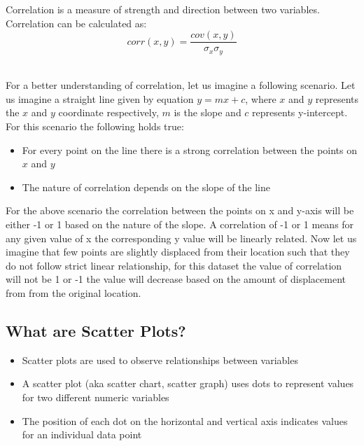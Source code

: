 \documentclass[twoside,12pt]{report}  %
\begin{document}
\begin{tcolorbox}[colback=red!5!white, colframe=red!75!black, title = \textbf{Covariance}]
	Correlation is a measure of strength and direction between two variables. Correlation can be calculated as:
	$$ \boxed{corr(x,y) = \frac{cov(x,y)}{\sigma_{x}\sigma_{y}}} $$
\end{tcolorbox}
\noindent
\\
For a better understanding of correlation, let us imagine a following scenario. Let us imagine a straight line given by equation $y=mx+c$, where $x$ and $y$ represents the $x$ and $y$ coordinate respectively, $m$ is the slope and $c$ represents y-intercept. For this scenario the following holds true:
\begin{itemize}
	\item For every point on the line there is a strong correlation between the points on $x$ and $y$
	\item The nature of correlation depends on the slope of the line
\end{itemize} 
\noindent
For the above scenario the correlation between the points on x and y-axis will be either -1 or 1 based on the nature of the slope. A correlation of -1 or 1 means for any given value of x the corresponding y value will be linearly related. Now let us imagine that few points are slightly displaced from their location such that they do not follow strict linear relationship, for this dataset the value of correlation will not be 1 or -1 the value will decrease based on the amount of displacement from from the original location. 

\subsection{What are Scatter Plots?}

\begin{itemize}
	\item Scatter plots are used to observe relationships between variables
	\item A scatter plot (aka scatter chart, scatter graph) uses dots to represent values for two different numeric variables
	\item The position of each dot on the horizontal and vertical axis indicates values for an individual data point
\end{itemize}
\end{document}
